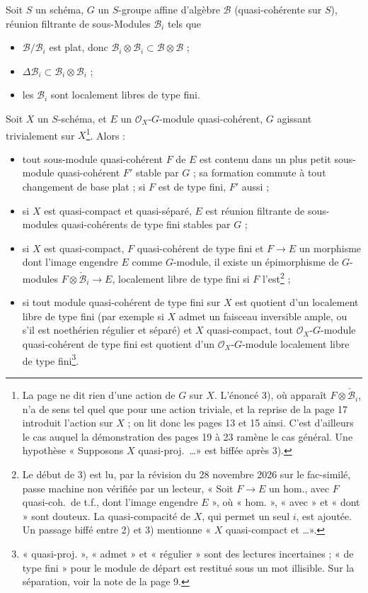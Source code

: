 \documentclass[11pt,a4paper]{article}
\begin{document}
Soit $S$ un schéma, $G$ un $S$-groupe affine d'algèbre $\mathcal{B}$
(quasi-cohérente sur $S$), réunion filtrante de sous-Modules
$\mathcal{B}_i$ tels que
\begin{itemize}
  \item[1)] $\mathcal{B}/\mathcal{B}_i$ est plat, donc $\mathcal{B}_i
    \otimes \mathcal{B}_i \subset \mathcal{B} \otimes \mathcal{B}$ ;
  \item[2)] $\Delta \mathcal{B}_i \subset \mathcal{B}_i \otimes
    \mathcal{B}_i$ ;
  \item[3)] les $\mathcal{B}_i$ sont localement libres de type fini.
\end{itemize}
Soit $X$ un $S$-schéma, et $E$ un $\mathcal{O}_X$-$G$-module
quasi-cohérent, $G$ agissant trivialement sur $X$\footnote{La page ne dit
rien d'une action de $G$ sur $X$. L'énoncé 3), où apparaît
$F \otimes \check{\mathcal{B}}_i$, n'a de sens tel quel que pour une
action triviale, et la reprise de la page 17 introduit l'action sur $X$ ;
on lit donc les pages 13 et 15 ainsi. C'est d'ailleurs le cas auquel la
démonstration des pages 19 à 23 ramène le cas général. Une hypothèse
« Supposons $X$ quasi-proj.\ \ldots » est biffée après 3).}. Alors :
\begin{itemize}
  \item[1)] tout sous-module quasi-cohérent $F$ de $E$ est contenu dans un
    plus petit sous-module quasi-cohérent $F'$ stable par $G$ ; sa
    formation commute à tout changement de base plat ; si $F$ est de type
    fini, $F'$ aussi ;
  \item[2)] si $X$ est quasi-compact et quasi-séparé, $E$ est réunion
    filtrante de sous-modules quasi-cohérents de type fini stables par $G$ ;
  \item[3)] si $X$ est quasi-compact, $F$ quasi-cohérent de type fini et
    $F \to E$ un morphisme dont l'image engendre $E$ comme $G$-module, il
    existe un épimorphisme de $G$-modules $F \otimes \check{\mathcal{B}}_i
    \to E$, localement libre de type fini si $F$ l'est\footnote{Le début
    de 3) est lu, par la révision du 28 novembre 2026 sur le fac-similé, passe machine non vérifiée par un lecteur, « Soit $F \to E$ un hom., avec $F$
    quasi-coh.\ de t.f., dont l'image engendre $E$ », où « hom. », « avec »
    et « dont » sont douteux. La quasi-compacité de $X$, qui permet
    un seul $i$, est ajoutée. Un passage biffé entre 2) et 3) mentionne
    « $X$ quasi-compact et \ldots ».} ;
  \item[4)] si tout module quasi-cohérent de type fini sur $X$ est quotient
    d'un localement libre de type fini (par exemple si $X$ admet un faisceau
    inversible ample, ou s'il est noethérien régulier et séparé) et $X$
    quasi-compact, tout $\mathcal{O}_X$-$G$-module quasi-cohérent de type
    fini est quotient d'un $\mathcal{O}_X$-$G$-module localement libre de
    type fini\footnote{« quasi-proj. », « admet » et « régulier » sont des
    lectures incertaines ; « de type fini » pour le module de départ est
    restitué sous un mot illisible. Sur la séparation, voir la note de la
    page 9.}.
\end{itemize}
\end{document}
